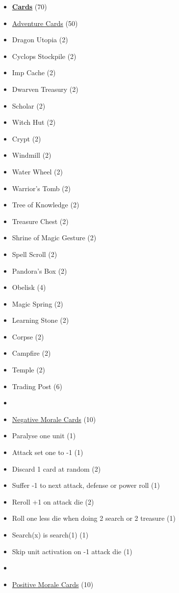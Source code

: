 \begin{multicols}{3}
\begin{itemize}[leftmargin=0pt, label={}, noitemsep, noitemsep]
  \item \textbf{\underline{Cards}} (70)
  \item \underline{Adventure Cards} (50)
  \item Dragon Utopia (2)
  \item Cyclops Stockpile (2)
  \item Imp Cache (2)
  \item Dwarven Treasury (2)
  \item Scholar (2)
  \item Witch Hut (2)
  \item Crypt (2)
  \item Windmill (2)
  \item Water Wheel (2)
  \item Warrior's Tomb (2)
  \item Tree of Knowledge (2)
  \item Treasure Chest (2)
  \item Shrine of Magic Gesture (2)
  \item Spell Scroll (2)
  \item Pandora's Box (2)
  \item Obelisk (4)
  \item Magic Spring (2)
  \item Learning Stone (2)
  \item Corpse (2)
  \item Campfire (2)
  \item Temple (2)
  \item Trading Post (6)
  \item
  \item \underline{Negative Morale Cards} (10)
  \item Paralyse one unit (1)
  \item Attack set one to -1 (1)
  \item Discard 1 card at random (2)
  \item Suffer -1 to next attack, defense or power roll (1)
  \item Reroll +1 on attack die (2)
  \item Roll one less die when doing 2 search or 2 treasure (1)
  \item Search(x) is search(1) (1)
  \item Skip unit activation on -1 attack die (1)
  \item
  \item \underline{Positive Morale Cards} (10)

\end{itemize}
\end{multicols}
